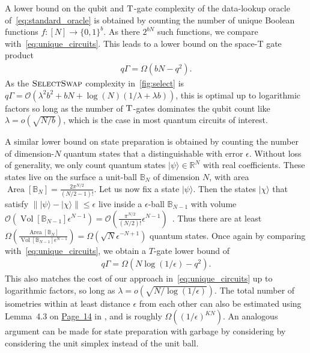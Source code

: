 \documentclass[a4paper,onecolumn,10pt,accepted=2024-05-22]{quantumarticle}
\newcommand{\ket}[1]{| #1\rangle}        %
\begin{document}
	A lower bound on the qubit and $\textsc{T}$-gate complexity of the data-lookup oracle of~\cref{eq:standard_oracle} is obtained by counting the number of unique Boolean functions $f:[N]\rightarrow \{0,1\}^b$. As there $2^{b N}$ such functions, we compare with~\cref{eq:unique_circuits}. This leads to a lower bound on the space-\textsc{T} gate product
	\begin{align}
	q\Gamma = \Omega(b N-q^2).
	\end{align} 
	As the $\textsc{SelectSwap}$ complexity in~\cref{fig:select} is $q\Gamma=\mathcal{O}(\lambda^2 b^2+bN+\log{(N)}(1/\lambda+\lambda b))$, this is optimal up to logarithmic factors so long as the number of $\textsc{T}$-gates dominates the qubit count like $\lambda=o(\sqrt{N/b})$, which is the case in most quantum circuits of interest.  
	
	A similar lower bound on state preparation is obtained by counting the number of dimension-$N$ quantum states that a distinguishable with error $\epsilon$. Without loss of generality, we only count quantum states $\ket{\psi}\in\mathbb{R}^N$ with real coefficients. These states live on the surface a unit-ball $\mathbb{B}_N$ of dimension $N$, with area $\operatorname{Area}[\mathbb{B}_N]=\frac{2\pi^{N/2}}{(N/2-1)!}$. Let us now fix a state $\ket{\psi}$. Then the states $\ket{\chi}$ that satisfy $\|\ket{\psi}-\ket{\chi}\|\le \epsilon$ live inside a $\epsilon$-ball $\mathbb{B}_{N-1}$ with volume $\mathcal{O}(\operatorname{Vol}[\mathbb{B}_{N-1}] \epsilon^{N-1})=\mathcal{O}(\frac{\pi^{N/2}}{(N/2)!}\epsilon^{N-1})$~\cite{Mora2005Algorithmic}. Thus there are at least $\Omega(\frac{\operatorname{Area}[\mathbb{B}_N]}{\operatorname{Vol}[\mathbb{B}_{N-1}]\epsilon^{N-1}})=\Omega(\sqrt{N}\epsilon^{-N+1})$ quantum states. Once again by comparing with~\cref{eq:unique_circuits}, we obtain a $T$-gate lower bound of
	\begin{align}
	q \Gamma=\Omega(N\log{(1/\epsilon)}-q^2).
	\end{align}
	This also matches the cost of our approach in~\cref{eq:unique_circuits} up to logarithmic factors, so long as $\lambda = o(\sqrt{N/\log{(1/\epsilon)}})$. The total number of isometries within at least distance $\epsilon$ from each other can also be estimated using Lemma~4.3 on \href{https://arxiv.org/pdf/quant-ph/9508006.pdf#page=15}{Page~14} in \cite{Knill1995ApproxByQCirc}, and is roughly $\Omega((1/\epsilon)^{K N})$. An analogous argument can be made for state preparation with garbage by considering by considering the unit simplex instead of the unit ball. 
	
\end{document}
